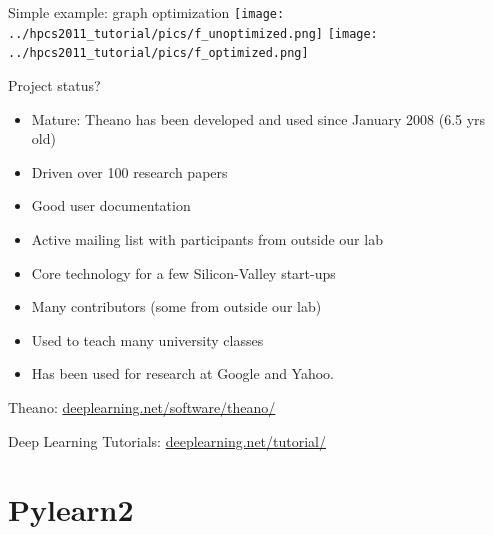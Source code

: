 \documentclass[utf8x,xcolor=pdftex,dvipsnames,table]{beamer}
\begin{document}
\begin{frame}{Simple example: graph optimization}
\center
\texttt{[image: ../hpcs2011\_tutorial/pics/f\_unoptimized.png]}
\hspace{0.1\textwidth}
\texttt{[image: ../hpcs2011\_tutorial/pics/f\_optimized.png]}

\end{frame}


\begin{frame}{Project status?}
  \begin{itemize}
    \item Mature: Theano has been developed and used since January 2008 (6.5 yrs old)
    \item Driven over 100 research papers
    \item Good user documentation
    \item Active mailing list with participants from outside our lab
    \item Core technology for a few Silicon-Valley start-ups
    \item Many contributors (some from outside our lab)
    \item Used to teach many university classes
    \item Has been used for research at Google and Yahoo.
  \end{itemize}
  Theano: \url{deeplearning.net/software/theano/}

  Deep Learning Tutorials: \url{deeplearning.net/tutorial/}
\end{frame}


\section{Pylearn2}
\begin{frame}
  \tableofcontents[currentsection]
\end{frame}
\end{document}
